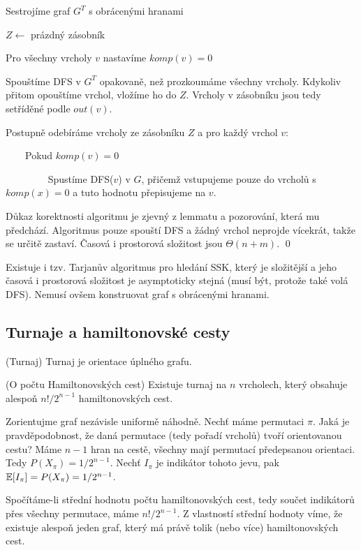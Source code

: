 \begin{enumerate*}
\item Sestrojíme graf $G^T$ s obrácenými hranami
\item $Z \leftarrow$ prázdný zásobník
\item Pro všechny vrcholy $v$ nastavíme $komp(v) = 0$
\item Spouštíme DFS v $G^T$ opakovaně, než prozkoumáme všechny vrcholy. Kdykoliv přitom opouštíme vrchol, vložíme ho do $Z$. Vrcholy v zásobníku jsou tedy setříděné podle $out(v)$.
\item Postupně odebíráme vrcholy ze zásobníku $Z$ a pro každý vrchol $v$:
\item $\qquad$Pokud $komp(v) = 0$
\leftmargin=6cm
\indent
\item $\qquad\qquad$ Spustíme DFS($v$) v $G$, přičemž vstupujeme pouze do vrcholů s $komp(x) = 0$ a tuto hodnotu přepisujeme na $v$.
\end{enumerate*}

\dk Důkaz korektnosti algoritmu je zjevný z lemmatu a pozorování, která mu předchází. Algoritmus pouze spouští DFS a žádný vrchol neprojde vícekrát, takže se určitě zastaví. Časová i prostorová složitost jsou $\Theta(n+m)$.
\qed

Existuje i tzv. Tarjanův algoritmus pro hledání SSK, který je složitější a jeho časová i prostorová složitost je asymptoticky stejná (musí být, protože také volá DFS). Nemusí ovšem konstruovat graf s obrácenými hranami.

\subsection{Turnaje a hamiltonovské cesty}

\df (Turnaj) Turnaj je orientace úplného grafu.

\vt (O počtu Hamiltonovských cest) Existuje turnaj na $n$ vrcholech, který 
obsahuje alespoň $n!/2^{n-1}$ hamiltonovských cest.

\dk Zorientujme graf nezávisle uniformě náhodně. Nechť máme permutaci $\pi$.  
Jaká je pravděpodobnost, že daná permutace (tedy pořadí vrcholů) tvoří 
orientovanou cestu? Máme $n-1$ hran na cestě, všechny mají permutací 
předepsanou orientaci. Tedy $P(X_\pi)= 1/2^{n-1}$. Nechť $I_\pi$ je indikátor 
tohoto jevu, pak $\mathbb{E}[I_\pi] = P(X_\pi) = 1/2^{n-1}$.

Spočítáme-li střední hodnotu počtu hamiltonovských cest, tedy součet indikátorů 
přes všechny permutace, máme $n!/2^{n-1}$. Z vlastností střední hodnoty víme, 
že existuje alespoň jeden graf, který má právě tolik (nebo více) hamiltonovských
cest.
